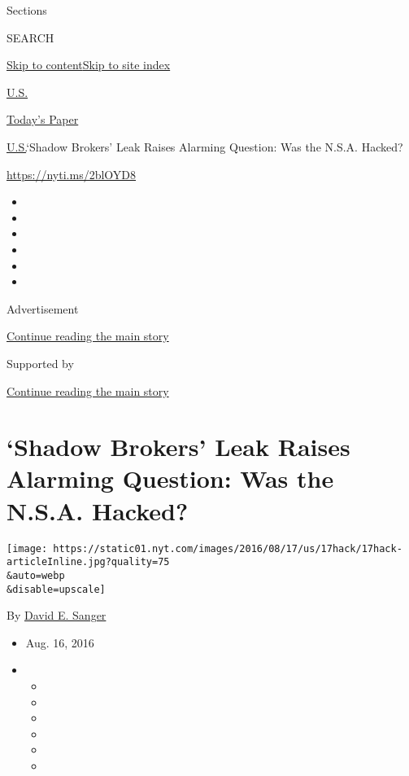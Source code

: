Sections

SEARCH

\protect\hyperlink{site-content}{Skip to
content}\protect\hyperlink{site-index}{Skip to site index}

\href{https://www.nytimes.com/section/us}{U.S.}

\href{https://myaccount.nytimes.com/auth/login?response_type=cookie\&client_id=vi}{}

\href{https://www.nytimes.com/section/todayspaper}{Today's Paper}

\href{/section/us}{U.S.}\textbar{}`Shadow Brokers' Leak Raises Alarming
Question: Was the N.S.A. Hacked?

\url{https://nyti.ms/2blOYD8}

\begin{itemize}
\item
\item
\item
\item
\item
\item
\end{itemize}

Advertisement

\protect\hyperlink{after-top}{Continue reading the main story}

Supported by

\protect\hyperlink{after-sponsor}{Continue reading the main story}

\hypertarget{shadow-brokers-leak-raises-alarming-question-was-the-nsa-hacked}{%
\section{`Shadow Brokers' Leak Raises Alarming Question: Was the N.S.A.
Hacked?}\label{shadow-brokers-leak-raises-alarming-question-was-the-nsa-hacked}}

\texttt{[image: https://static01.nyt.com/images/2016/08/17/us/17hack/17hack-articleInline.jpg?quality=75\\\&auto=webp\\\&disable=upscale]}

By \href{http://www.nytimes.com/by/david-e-sanger}{David E. Sanger}

\begin{itemize}
\item
  Aug. 16, 2016
\item
  \begin{itemize}
  \item
  \item
  \item
  \item
  \item
  \item
  \end{itemize}
\end{itemize}

